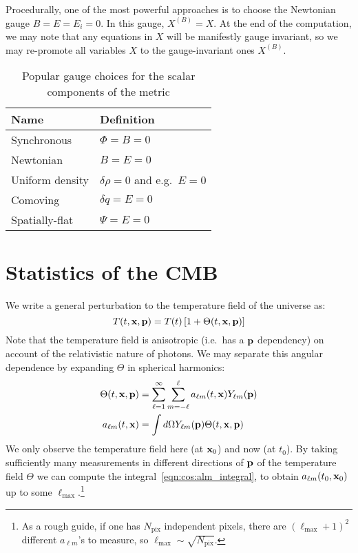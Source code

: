 Procedurally, one of  the most powerful approaches is to choose the Newtonian gauge ${B=E=E_i=0}$. In this gauge, $X^{(B)}=X$. At the end of the computation, we may note that any equations in $X$ will be manifestly gauge invariant, so we may re-promote all variables $X$ to the gauge-invariant ones $X^{(B)}$.


\begin{table}
  \centering
\begin{tabular}{ll}
 \toprule
  Name & Definition \\
 \midrule
 \midrule
 Synchronous & $\Phi=B=0$ \\
 Newtonian & $B=E=0$ \\
 Uniform density & $\delta\rho=0$ and e.g.\ $E=0$ \\
 Comoving & $\delta q = E = 0$ \\
 Spatially-flat & $\Psi=E=0$ \\
 \bottomrule
\end{tabular}
\caption{Popular gauge choices for the scalar components of the metric}\label{tab:cos:gauge_choice}
\end{table}




\section{Statistics of the CMB}
We write a general perturbation to the temperature field of the universe as:
\begin{equation}
  T(t,\mathbf{x},\mathbf{p}) = T(t)\left[ 1+\Theta(t,\mathbf{x},\mathbf{p}) \right]
\end{equation}
Note that the temperature field is anisotropic (i.e.\ has a $\mathbf{p}$ dependency) on account of the relativistic nature of photons. We may separate this angular dependence by expanding $\Theta$ in spherical harmonics:
\begin{align}
  \Theta(t,\mathbf{x},\mathbf{p}) &= \sum_{\ell=1}^{\infty}\sum_{m=-\ell}^{\ell}a_{\ell m}(t,\mathbf{x}) Y_{\ell m}(\mathbf{p})\\
  a_{\ell m}(t,\mathbf{x}) &= \int d\Omega Y_{\ell m}(\mathbf{p}) \Theta(t,\mathbf{x},\mathbf{p})
  \label{eqn:cos:alm_integral}
\end{align}
We only observe the temperature field here (at $\mathbf{x}_0$) and now (at $t_0$). By taking sufficiently many measurements in different directions of $\mathbf{p}$ of the temperature field $\Theta$ we can compute the integral~\eqref{eqn:cos:alm_integral}, to obtain $a_{\ell m}(t_0,\mathbf{x}_0)$ up to some $\ell_{\max{}}$.\footnote{As a rough guide, if one has $N_\mathrm{pix}$ independent pixels, there are ${(\ell_{\max{}}+1)}^2$ different $a_{\ell m}$'s to measure, so $\ell_{\max{}} \sim \sqrt{N_\mathrm{pix}}$.}

